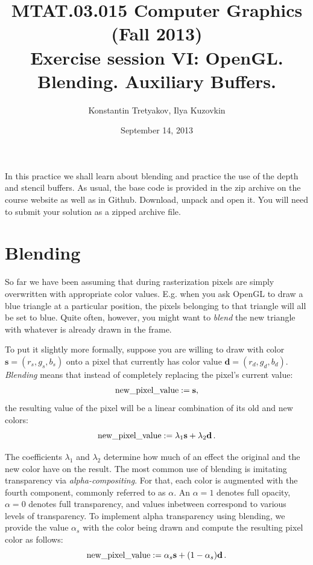 \documentclass{article}
\newcommand{\bd}{\mathbf{d}}
\newcommand{\bs}{\mathbf{s}}
\begin{document}
\title{MTAT.03.015 Computer Graphics (Fall 2013)\\
Exercise session VI: OpenGL. Blending. Auxiliary Buffers.}
\author{Konstantin Tretyakov, Ilya Kuzovkin}
\date{September 14, 2013}
\maketitle

In this practice we shall learn about blending and practice the use of the depth and stencil buffers. As usual, the base code is provided in the zip archive on the course website as well as in Github. Download, unpack and open it. You will need to submit your solution as a zipped archive file.

\section{Blending}
So far we have been assuming that during rasterization pixels are simply overwritten with appropriate color values. E.g. when you ask OpenGL to draw a blue triangle at a particular position, the pixels belonging to that triangle will all be set to blue. Quite often, however, you might want to \emph{blend} the new triangle with whatever is already drawn in the frame. 

To put it slightly more formally, suppose you are willing to draw with color $\bs = (r_s, g_s, b_s)$ onto a pixel that currently has color value $\bd = (r_d, g_d, b_d)$. \emph{Blending} means that instead of completely replacing the pixel's current value:
$$
\text{new\textunderscore pixel\textunderscore value} := \bs,
$$
the resulting value of the pixel will be a linear combination of its old and new colors:
$$
\text{new\textunderscore pixel\textunderscore value} := \lambda_1 \bs + \lambda_2 \bd\,.
$$

The coefficients $\lambda_1$ and $\lambda_2$ determine how much of an effect the original and the new color have on the result. The most common use of blending is imitating transparency via \emph{alpha-compositing}. For that, each color is augmented with the fourth component, commonly referred to as $\alpha$. An $\alpha = 1$ denotes full opacity, $\alpha = 0$ denotes full transparency, and values inbetween correspond to various levels of transparency. To implement alpha transparency using blending, we provide the value $\alpha_s$ with the color being drawn and compute the resulting pixel color as follows:
$$
\text{new\textunderscore pixel\textunderscore value} := \alpha_s \bs + (1-\alpha_s) \bd\,.
$$
\end{document}
